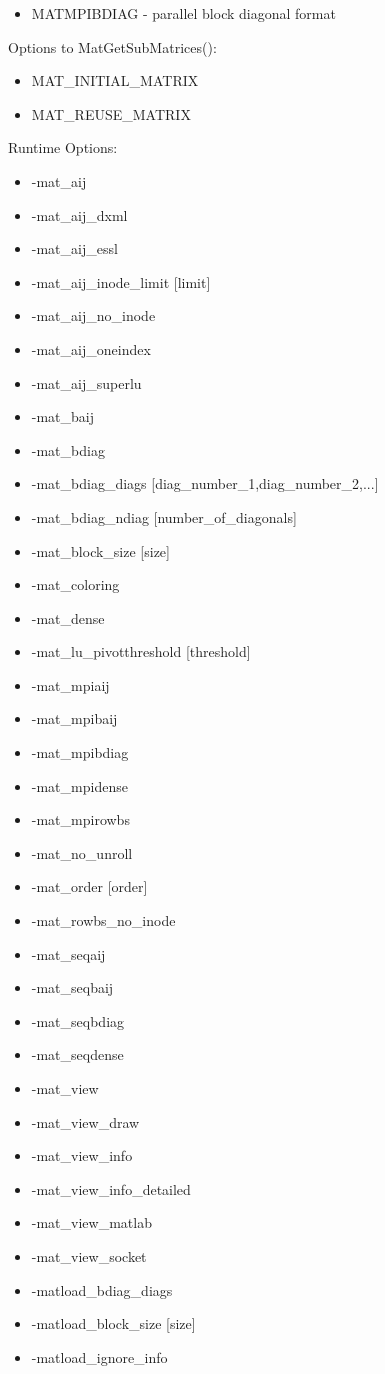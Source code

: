 {\begin{itemize}
\item MATMPIBDIAG - parallel block diagonal format
\end{itemize}
Options to MatGetSubMatrices():
\begin{itemize}
\item MAT\_INITIAL\_MATRIX
\item MAT\_REUSE\_MATRIX
\end{itemize}
Runtime Options:
\begin{itemize}
\item -mat\_aij
\item -mat\_aij\_dxml
\item -mat\_aij\_essl
\item -mat\_aij\_inode\_limit [limit]
\item -mat\_aij\_no\_inode
\item -mat\_aij\_oneindex
\item -mat\_aij\_superlu
\item -mat\_baij
\item -mat\_bdiag
\item -mat\_bdiag\_diags [diag\_number\_1,diag\_number\_2,...]
\item -mat\_bdiag\_ndiag [number\_of\_diagonals]
\item -mat\_block\_size [size]
\item -mat\_coloring
\item -mat\_dense
\item -mat\_lu\_pivotthreshold [threshold]
\item -mat\_mpiaij
\item -mat\_mpibaij
\item -mat\_mpibdiag
\item -mat\_mpidense
\item -mat\_mpirowbs
\item -mat\_no\_unroll
\item -mat\_order [order]
\item -mat\_rowbs\_no\_inode
\item -mat\_seqaij
\item -mat\_seqbaij
\item -mat\_seqbdiag
\item -mat\_seqdense
\item -mat\_view
\item -mat\_view\_draw
\item -mat\_view\_info
\item -mat\_view\_info\_detailed
\item -mat\_view\_matlab
\item -mat\_view\_socket
\item -matload\_bdiag\_diags 
\item -matload\_block\_size [size]
\item -matload\_ignore\_info
\end{itemize}

}
